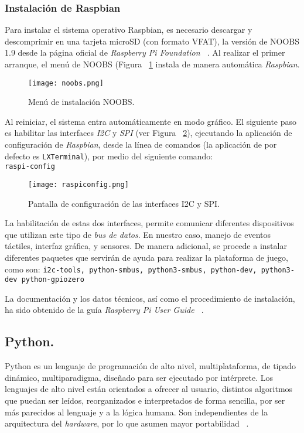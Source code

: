 \subsubsection{Instalación de Raspbian}
Para instalar el sistema operativo Raspbian, es necesario descargar y descomprimir en una tarjeta microSD (con formato VFAT), la versión de NOOBS 1.9 desde la página oficial de \emph{Raspberry Pi Foundation ~\cite{Noobs}}.
Al realizar el primer arranque, el menú de NOOBS (Figura ~\ref{fig:noobs} instala de manera automática \emph{Raspbian}.
\begin{figure}[!h]
\begin{center}
\texttt{[image: noobs.png]}
\caption{Menú de instalación NOOBS.}
\label{fig:noobs}
\end{center}
\end{figure}
Al reiniciar, el sistema entra automáticamente en modo gráfico. El siguiente paso es habilitar las interfaces \emph{I2C} y \emph{SPI} (ver Figura ~\ref{fig:raspiconfig}), ejecutando la aplicación de configuración de \emph{Raspbian}, desde la línea de comandos (la aplicación de por defecto es \texttt{LXTerminal}), por medio del siguiente comando:\\
\colorbox[gray]{0.85}{\texttt{raspi-config}}


\begin{figure}[!h]
\begin{center}
\texttt{[image: raspiconfig.png]}
\caption{Pantalla de configuración de las interfaces I2C y SPI.}
\label{fig:raspiconfig}
\end{center}
\end{figure}

La habilitación de estas dos interfaces, permite comunicar diferentes dispositivos que utilizan este tipo de \emph{bus de datos}. En nuestro caso, manejo de eventos táctiles, interfaz gráfica, y sensores.
De manera adicional, se procede a instalar diferentes paquetes que servirán de ayuda para realizar la plataforma de juego, como son: \texttt{i2c-tools, python-smbus, python3-smbus, python-dev, python3-dev python-gpiozero}

La documentación y los datos técnicos, así como el procedimiento de instalación, ha sido obtenido de la guía \emph{Raspberry Pi User Guide ~\cite{Upton}}.  

\subsection{Python.}
Python es un lenguaje de programación de alto nivel, multiplataforma, de tipado dinámico, multiparadigma, diseñado para ser ejecutado por intérprete. Los lenguajes de alto nivel están orientados a ofrecer al usuario, distintos algoritmos que puedan ser leídos, reorganizados e interpretados de forma sencilla, por ser más parecidos al lenguaje y a la lógica humana. Son independientes de la arquitectura del \emph{hardware}, por lo que asumen mayor portabilidad ~\cite{Python}.

